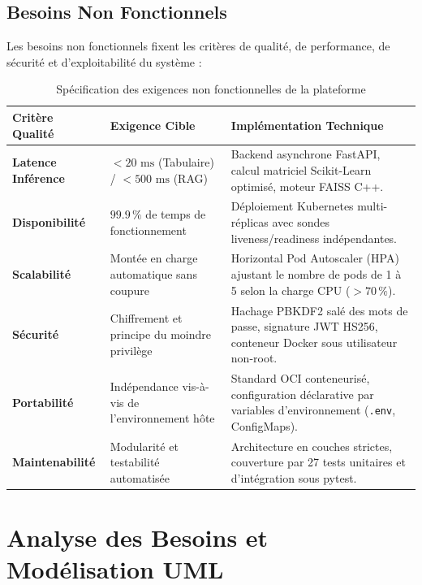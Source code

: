 \documentclass[11pt,a4paper,oneside]{report}
\begin{document}
\newpage
\subsection{Besoins Non Fonctionnels}
Les besoins non fonctionnels fixent les critères de qualité, de performance, de sécurité et d'exploitabilité du système :

\begin{table}[H]
\centering
\small
{}
\begin{tabularx}{\textwidth}{@{}p{3.4cm}p{4.2cm}X@{}}
\toprule
\textbf{Critère Qualité} & \textbf{Exigence Cible} & \textbf{Implémentation Technique} \\ \midrule
\textbf{Latence Inférence} & $< 20\text{ ms}$ (Tabulaire) / $< 500\text{ ms}$ (RAG) & Backend asynchrone FastAPI, calcul matriciel Scikit-Learn optimisé, moteur FAISS C++. \\
\textbf{Disponibilité} & $99.9\,\%$ de temps de fonctionnement & Déploiement Kubernetes multi-réplicas avec sondes liveness/readiness indépendantes. \\
\textbf{Scalabilité} & Montée en charge automatique sans coupure & Horizontal Pod Autoscaler (HPA) ajustant le nombre de pods de 1 à 5 selon la charge CPU ($>70\,\%$). \\
\textbf{Sécurité} & Chiffrement et principe du moindre privilège & Hachage PBKDF2 salé des mots de passe, signature JWT HS256, conteneur Docker sous utilisateur non-root. \\
\textbf{Portabilité} & Indépendance vis-à-vis de l'environnement hôte & Standard OCI conteneurisé, configuration déclarative par variables d'environnement (\texttt{.env}, ConfigMaps). \\
\textbf{Maintenabilité} & Modularité et testabilité automatisée & Architecture en couches strictes, couverture par 27 tests unitaires et d'intégration sous pytest. \\ \bottomrule
\end{tabularx}
\caption{Spécification des exigences non fonctionnelles de la plateforme}
\label{tab:besoins_non_fonct}
\end{table}

\section{Analyse des Besoins et Modélisation UML}
\end{document}
